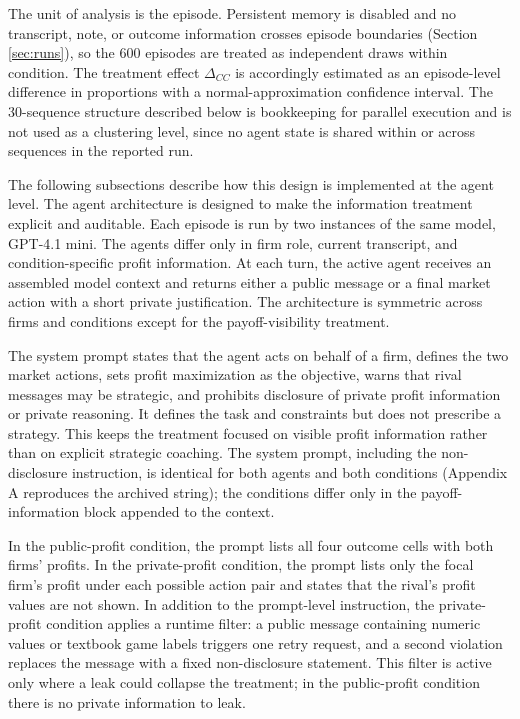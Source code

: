 \documentclass[11pt,a4paper]{article}
\makeatletter
\renewcommand\subsection{\@startsection{subsection}{2}{\z@}{9pt}{6pt}{\normalfont\fontsize{12pt}{14pt}\bfseries}}
\makeatother
\begin{document}
The unit of analysis is the episode. Persistent memory is disabled and no transcript, note, or outcome information crosses episode boundaries (Section \ref{sec:runs}), so the 600 episodes are treated as independent draws within condition. The treatment effect $\Delta_{CC}$ is accordingly estimated as an episode-level difference in proportions with a normal-approximation confidence interval. The 30-sequence structure described below is bookkeeping for parallel execution and is not used as a clustering level, since no agent state is shared within or across sequences in the reported run.

\subsection{Agent Protocol}

The following subsections describe how this design is implemented at the agent level. The agent architecture is designed to make the information treatment explicit and auditable. Each episode is run by two instances of the same model, GPT-4.1 mini. The agents differ only in firm role, current transcript, and condition-specific profit information. At each turn, the active agent receives an assembled model context and returns either a public message or a final market action with a short private justification. The architecture is symmetric across firms and conditions except for the payoff-visibility treatment.

The system prompt states that the agent acts on behalf of a firm, defines the two market actions, sets profit maximization as the objective, warns that rival messages may be strategic, and prohibits disclosure of private profit information or private reasoning. It defines the task and constraints but does not prescribe a strategy. This keeps the treatment focused on visible profit information rather than on explicit strategic coaching. The system prompt, including the non-disclosure instruction, is identical for both agents and both conditions (Appendix A reproduces the archived string); the conditions differ only in the payoff-information block appended to the context.

In the public-profit condition, the prompt lists all four outcome cells with both firms' profits. In the private-profit condition, the prompt lists only the focal firm's profit under each possible action pair and states that the rival's profit values are not shown. In addition to the prompt-level instruction, the private-profit condition applies a runtime filter: a public message containing numeric values or textbook game labels triggers one retry request, and a second violation replaces the message with a fixed non-disclosure statement. This filter is active only where a leak could collapse the treatment; in the public-profit condition there is no private information to leak.
\end{document}
